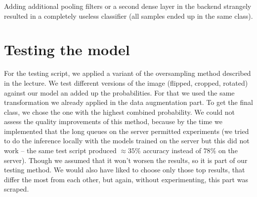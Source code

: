 Adding additional pooling filters or a second dense layer in the backend strangely resulted in a completely useless classifier (all samples ended up in the same class).

\section{Testing the model}
For the testing script, we applied a variant of the oversampling method described in the lecture. We test different versions of the image (flipped, cropped, rotated) against our model an added up the probabilities. For that we used the same transformation we already applied in the data augmentation part. To get the final class, we chose the one with the highest combined probability. We could not assess the quality improvements of this method, because by the time we implemented that the long queues on the server permitted experiments (we tried to do the inference locally with the models trained on the server but this did not work -- the same test script produced $\approx 35\%$ accuracy instead of $78\%$ on the server). Though we assumed that it won't worsen the results, so it is part of our testing method. We would also have liked to choose only those top results, that differ the most from each other, but again, without experimenting, this part was scraped.

